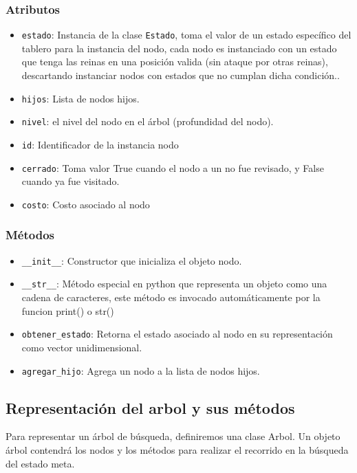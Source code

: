 \documentclass[conference]{IEEEtran}
\begin{document}
\subsubsection{Atributos}\label{AA_1}
\begin{itemize}
\item \texttt{estado}: Instancia de la clase \texttt{Estado}, toma el valor de un estado específico del tablero para la instancia del nodo, cada nodo es instanciado con un estado que tenga las reinas en una posición valida (sin ataque por otras reinas), descartando instanciar nodos con estados que no cumplan dicha condición.\cite{r5_set_backtrack}.
\item \texttt{hijos}: Lista de nodos hijos.
\item \texttt{nivel}: el nivel del nodo en el árbol (profundidad del nodo).
\item \texttt{id}: Identificador de la instancia nodo
\item \texttt{cerrado}: Toma valor True cuando el nodo a un no fue revisado, y False cuando ya fue visitado.
\item \texttt{costo}: Costo asociado al nodo

\end{itemize}
\subsubsection{Métodos}\label{AA_1}
\begin{itemize}
\item \texttt{\_\_init\_\_}: Constructor que inicializa el objeto nodo.
\item \texttt{\_\_str\_\_}: Método especial en python que representa un objeto como una cadena de caracteres, este método es invocado automáticamente por la funcion print() o str()
\item \texttt{obtener\_estado}: Retorna el estado asociado al nodo en su representación como vector unidimensional.
\item \texttt{agregar\_hijo}: Agrega un nodo a la lista de nodos hijos.
\end{itemize}

\subsection{Representación del arbol y sus métodos}
Para representar un árbol de búsqueda, definiremos una clase Arbol. Un objeto árbol contendrá los nodos y los métodos para realizar el recorrido en la búsqueda del estado meta.
    
\end{document}
